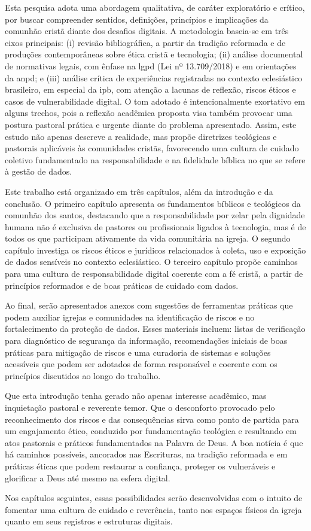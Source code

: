 Esta pesquisa adota uma abordagem qualitativa, de caráter exploratório e crítico, por buscar compreender sentidos, definições, princípios e implicações da comunhão cristã diante dos desafios digitais. A metodologia baseia-se em três eixos principais: (i) revisão bibliográfica, a partir da tradição reformada e de produções contemporâneas sobre ética cristã e tecnologia; (ii) análise documental de normativas legais, com ênfase na \gls{lgpd} (Lei nº 13.709/2018) e em orientações da \gls{anpd}; e (iii) análise crítica de experiências registradas no contexto eclesiástico brasileiro, em especial da \gls{ipb}, com atenção a lacunas de reflexão, riscos éticos e casos de vulnerabilidade digital. O tom adotado é intencionalmente exortativo em alguns trechos, pois a reflexão acadêmica proposta visa também provocar uma postura pastoral prática e urgente diante do problema apresentado. Assim, este estudo não apenas descreve a realidade, mas propõe diretrizes teológicas e pastorais aplicáveis às comunidades cristãs, favorecendo uma cultura de cuidado coletivo fundamentado na responsabilidade e na fidelidade bíblica no que se refere à gestão de dados.

Este trabalho está organizado em três capítulos, além da introdução e da conclusão. O primeiro capítulo apresenta os fundamentos bíblicos e teológicos da comunhão dos santos, destacando que a responsabilidade por zelar pela dignidade humana não é exclusiva de pastores ou profissionais ligados à tecnologia, mas é de todos os que participam ativamente da vida comunitária na igreja. O segundo capítulo investiga os riscos éticos e jurídicos relacionados à coleta, uso e exposição de dados sensíveis no contexto eclesiástico. O terceiro capítulo propõe caminhos para uma cultura de responsabilidade digital coerente com a fé cristã, a partir de princípios reformados e de boas práticas de cuidado com dados.

Ao final, serão apresentados anexos com sugestões de ferramentas práticas que podem auxiliar igrejas e comunidades na identificação de riscos e no fortalecimento da proteção de dados. Esses materiais incluem: listas de verificação para diagnóstico de segurança da informação, recomendações iniciais de boas práticas para mitigação de riscos e uma curadoria de sistemas e soluções acessíveis que podem ser adotados de forma responsável e coerente com os princípios discutidos ao longo do trabalho.

Que esta introdução tenha gerado não apenas interesse acadêmico, mas inquietação pastoral e reverente temor. Que o desconforto provocado pelo reconhecimento dos riscos e das consequências sirva como ponto de partida para um engajamento ético, conduzido por fundamentação teológica e resultando em atos pastorais e práticos fundamentados na Palavra de Deus. A boa notícia é que há caminhos possíveis, ancorados nas Escrituras, na tradição reformada e em práticas éticas que podem restaurar a confiança, proteger os vulneráveis e glorificar a Deus até mesmo na esfera digital.

Nos capítulos seguintes, essas possibilidades serão desenvolvidas com o intuito de fomentar uma cultura de cuidado e reverência, tanto nos espaços físicos da igreja quanto em seus registros e estruturas digitais.

